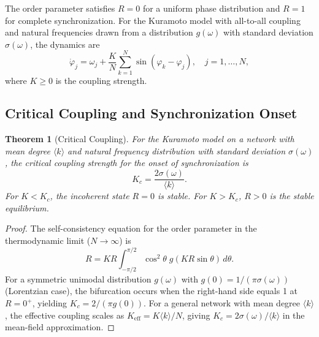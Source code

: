\documentclass[aps,prd,twocolumn,superscriptaddress,floatfix,nofootinbib]{revtex4-2}
\newtheorem{theorem}{Theorem}[section]
\theoremstyle{remark}
\newcommand{\Rorder}{R}
\newcommand{\Kc}{K_c}
\begin{document}
The order parameter satisfies $\Rorder = 0$ for a uniform phase distribution and $\Rorder = 1$ for complete synchronization. For the Kuramoto model with all-to-all coupling and natural frequencies drawn from a distribution $g(\omega)$ with standard deviation $\sigma(\omega)$, the dynamics are~\cite{kuramoto1984chemical,strogatz2000kuramoto,acebron2005kuramoto}
\begin{equation}
    \dot{\varphi}_j = \omega_j + \frac{K}{N} \sum_{k=1}^{N} \sin(\varphi_k - \varphi_j), \quad j = 1, \ldots, N,
    \label{eq:kuramoto_dynamics}
\end{equation}
where $K \geq 0$ is the coupling strength.

\subsection{Critical Coupling and Synchronization Onset}

\begin{theorem}[Critical Coupling]
\label{thm:critical}
For the Kuramoto model on a network with mean degree $\langle k \rangle$ and natural frequency distribution with standard deviation $\sigma(\omega)$, the critical coupling strength for the onset of synchronization is
\begin{equation}
    \boxed{\Kc = \frac{2\sigma(\omega)}{\langle k \rangle}.}
    \label{eq:kc}
\end{equation}
For $K < \Kc$, the incoherent state $\Rorder = 0$ is stable. For $K > \Kc$, $\Rorder > 0$ is the stable equilibrium.
\end{theorem}

\begin{proof}
The self-consistency equation for the order parameter in the thermodynamic limit ($N \to \infty$) is~\cite{strogatz2000kuramoto,acebron2005kuramoto}
\begin{equation}
    \Rorder = K\Rorder \int_{-\pi/2}^{\pi/2} \cos^2\theta \; g(K\Rorder \sin\theta) \, d\theta.
\end{equation}
For a symmetric unimodal distribution $g(\omega)$ with $g(0) = 1/(\pi \sigma(\omega))$ (Lorentzian case), the bifurcation occurs when the right-hand side equals 1 at $\Rorder = 0^+$, yielding $K_c = 2/(\pi g(0))$. For a general network with mean degree $\langle k \rangle$, the effective coupling scales as $K_{\text{eff}} = K \langle k \rangle / N$, giving $\Kc = 2\sigma(\omega)/\langle k \rangle$ in the mean-field approximation.
\end{proof}
\end{document}
